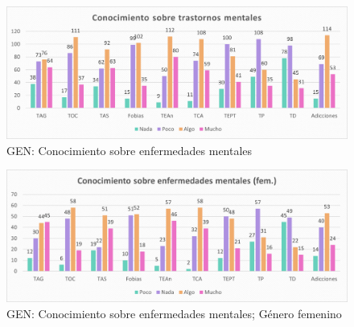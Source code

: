 \documentclass[12pt, a4paper,twoside,titlepage]{book}
\begin{document}
\begin{figure}
    \centering
    \includegraphics[width=1\linewidth]{ANEXO Gen/10AnexGENCon}
    \caption{GEN: Conocimiento sobre enfermedades mentales}
    \label{fig:GENCon}
\end{figure}

\begin{figure}
    \centering
    \includegraphics[width=1\linewidth]{ANEXO Gen/11AnexGENCongfem}
    \caption{GEN: Conocimiento sobre enfermedades mentales; Género femenino}
   
\end{figure}
\end{document}
